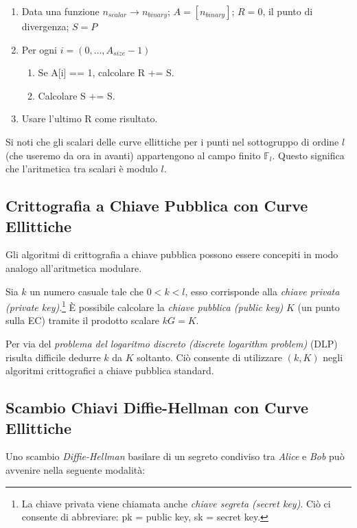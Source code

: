 \begin{enumerate}
	\item Data una funzione \(n_{scalar} \rightarrow n_{binary}\); \(A = [n_{binary}]\); \(R = 0\), il punto di divergenza; \(S = P\)
	\item Per ogni \(i = (0, \ldots, A_{size} - 1)\)
	\begin{enumerate}
		\item Se A[i] == 1, calcolare R += S.
		\item Calcolare S += S.
	\end{enumerate}
	\item Usare l'ultimo R come risultato.
\end{enumerate}

Si noti che gli scalari delle curve ellittiche per i punti nel sottogruppo di ordine \(l\) (che useremo da ora in avanti) appartengono al campo finito \(\mathbb{F}_l\). Questo significa che l’aritmetica tra scalari è modulo \(l\).


\subsection{Crittografia a Chiave Pubblica con Curve Ellittiche}
\label{ec:keys}
Gli algoritmi di crittografia a chiave pubblica possono essere concepiti in modo analogo all'aritmetica modulare.

Sia \(k\) un numero casuale tale che \(0 < k < l\), esso corrisponde alla {\em chiave privata (private key)}.\footnote{La chiave privata viene chiamata anche {\em chiave segreta (secret key)}. Ciò ci consente di abbreviare: pk = public key, sk = secret key.} È possibile calcolare la {\em chiave pubblica (public key)} \(K\) (un punto sulla EC) tramite il prodotto scalare \(k G = K\). 

Per via del {\em problema del logaritmo discreto (discrete logarithm problem)} (DLP) risulta difficile dedurre \(k\) da \(K\) soltanto. Ciò consente di utilizzare \((k, K)\) negli algoritmi crittografici a chiave pubblica standard.


\subsection{Scambio Chiavi Diffie-Hellman con Curve Ellittiche}
\label{DH_exchange_section}

Uno scambio {\em Diffie-Hellman} \cite{Diffie-Hellman} basilare di un segreto condiviso tra {\em Alice} e {\em Bob} può avvenire nella seguente modalità:

